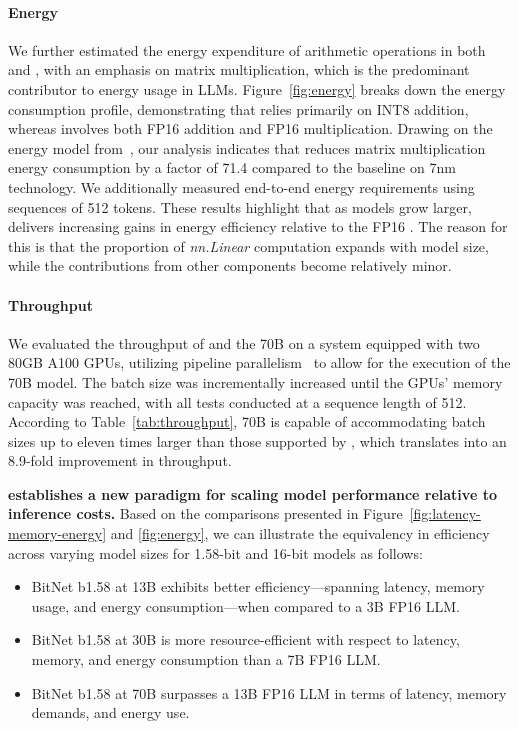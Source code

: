 \paragraph{Energy}

We further estimated the energy expenditure of arithmetic operations in both  and , with an emphasis on matrix multiplication, which is the predominant contributor to energy usage in LLMs. Figure~\ref{fig:energy} breaks down the energy consumption profile, demonstrating that  relies primarily on INT8 addition, whereas  involves both FP16 addition and FP16 multiplication. Drawing on the energy model from~\cite{energycost, pokebnn}, our analysis indicates that  reduces matrix multiplication energy consumption by a factor of 71.4 compared to the baseline on 7nm technology. We additionally measured end-to-end energy requirements using sequences of 512 tokens. These results highlight that as models grow larger,  delivers increasing gains in energy efficiency relative to the FP16 . The reason for this is that the proportion of \emph{nn.Linear} computation expands with model size, while the contributions from other components become relatively minor.

\paragraph{Throughput}

We evaluated the throughput of  and the  70B on a system equipped with two 80GB A100 GPUs, utilizing pipeline parallelism~\cite{gpipe} to allow for the execution of the  70B model. The batch size was incrementally increased until the GPUs' memory capacity was reached, with all tests conducted at a sequence length of 512. According to Table~\ref{tab:throughput},  70B is capable of accommodating batch sizes up to eleven times larger than those supported by , which translates into an 8.9-fold improvement in throughput.

\textbf{ establishes a new paradigm for scaling model performance relative to inference costs.} Based on the comparisons presented in Figure~\ref{fig:latency-memory-energy} and \ref{fig:energy}, we can illustrate the equivalency in efficiency across varying model sizes for 1.58-bit and 16-bit models as follows:

\begin{itemize}
    \item BitNet b1.58 at 13B exhibits better efficiency—spanning latency, memory usage, and energy consumption—when compared to a 3B FP16 LLM.
    \item BitNet b1.58 at 30B is more resource-efficient with respect to latency, memory, and energy consumption than a 7B FP16 LLM.
    \item BitNet b1.58 at 70B surpasses a 13B FP16 LLM in terms of latency, memory demands, and energy use.
\end{itemize}


